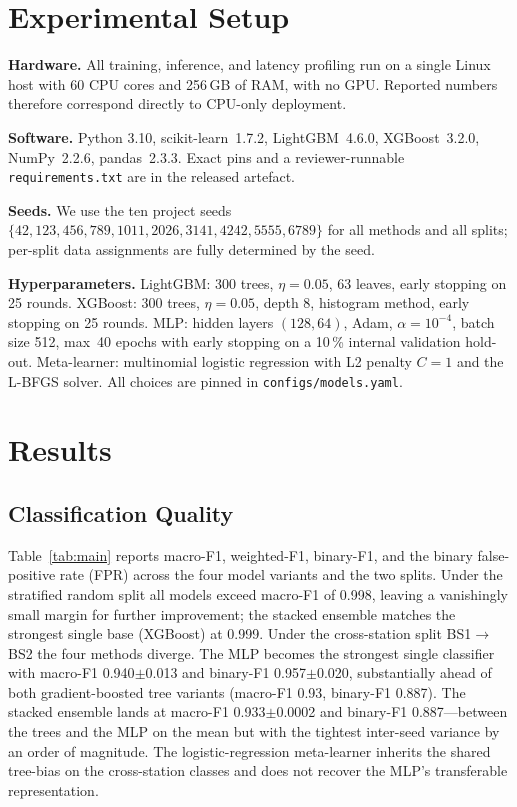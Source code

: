 \documentclass[conference]{IEEEtran}
\begin{document}
\section{Experimental Setup}
\label{sec:setup}

\textbf{Hardware.} All training, inference, and latency profiling run on
a single Linux host with 60 CPU cores and 256\,GB of RAM, with no GPU.
Reported numbers therefore correspond directly to CPU-only deployment.

\textbf{Software.} Python 3.10, scikit-learn~1.7.2, LightGBM~4.6.0,
XGBoost~3.2.0, NumPy~2.2.6, pandas~2.3.3. Exact pins and a reviewer-runnable
\texttt{requirements.txt} are in the released artefact.

\textbf{Seeds.} We use the ten project seeds
$\{42, 123, 456, 789, 1011, 2026, 3141, 4242, 5555, 6789\}$ for all
methods and all splits; per-split data assignments are fully determined
by the seed.

\textbf{Hyperparameters.} LightGBM: 300 trees, $\eta=0.05$, 63 leaves,
early stopping on 25 rounds. XGBoost: 300 trees, $\eta=0.05$, depth 8,
histogram method, early stopping on 25 rounds. MLP: hidden layers
$(128, 64)$, Adam, $\alpha=10^{-4}$, batch size 512, max~40 epochs with
early stopping on a 10\,\% internal validation hold-out. Meta-learner:
multinomial logistic regression with L2 penalty $C=1$ and the L-BFGS
solver. All choices are pinned in \texttt{configs/models.yaml}.

\section{Results}
\label{sec:results}

\subsection{Classification Quality}

Table~\ref{tab:main} reports macro-F1, weighted-F1, binary-F1, and the
binary false-positive rate (FPR) across the four model variants and the
two splits. Under the stratified random split all models exceed
macro-F1 of 0.998, leaving a vanishingly small margin for further
improvement; the stacked ensemble matches the strongest single base
(XGBoost) at 0.999. Under the cross-station split BS1$\rightarrow$BS2
the four methods diverge. The MLP becomes the strongest single
classifier with macro-F1 0.940$\pm$0.013 and binary-F1 0.957$\pm$0.020,
substantially ahead of both gradient-boosted tree variants
(macro-F1 0.93, binary-F1 0.887). The stacked ensemble lands at
macro-F1 0.933$\pm$0.0002 and binary-F1 0.887---between the trees and
the MLP on the mean but with the tightest inter-seed variance by an
order of magnitude. The logistic-regression meta-learner inherits the
shared tree-bias on the cross-station classes and does not recover the
MLP's transferable representation.
\end{document}
